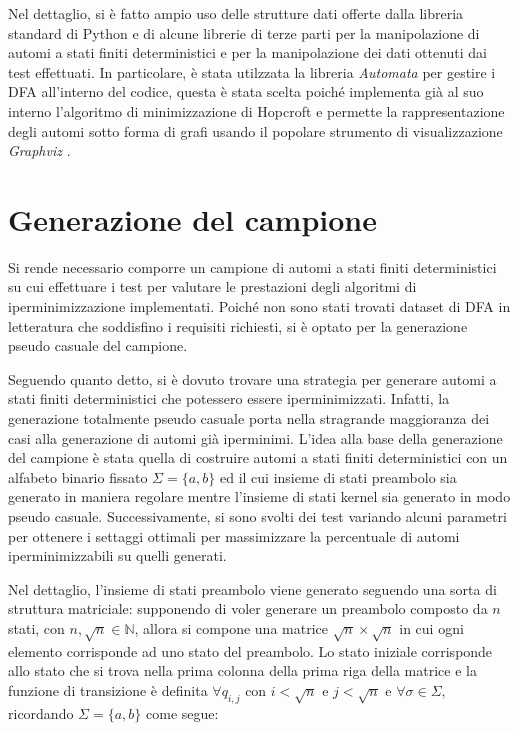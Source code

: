 \documentclass[a4paper,12pt,twoside, openright]{report} %
\begin{document}
Nel dettaglio, si è fatto ampio uso delle strutture dati offerte dalla libreria standard di Python e 
di alcune librerie di terze parti per la manipolazione di automi a stati finiti deterministici e per la 
manipolazione dei dati ottenuti dai test effettuati. In particolare, è stata utilzzata la 
libreria \emph{Automata} \parencite{Automata} per gestire i DFA all'interno del codice, questa
è stata scelta poiché implementa già al suo interno l'algoritmo di minimizzazione di Hopcroft e permette la
rappresentazione degli automi sotto forma di grafi usando il popolare strumento di visualizzazione 
\emph{Graphviz} \parencite{Graphviz}.

\section{Generazione del campione}
\label{sec:sample-generation}

Si rende necessario comporre un campione di automi a stati finiti deterministici su cui effettuare i test
per valutare le prestazioni degli algoritmi di iperminimizzazione implementati. Poiché non sono stati trovati
dataset di DFA in letteratura che soddisfino i requisiti richiesti,
si è optato per la generazione pseudo casuale del campione.

Seguendo quanto detto, si è dovuto trovare una strategia per generare automi a stati finiti deterministici
che potessero essere iperminimizzati. Infatti, la generazione totalmente pseudo casuale porta nella stragrande
maggioranza dei casi alla generazione di automi già iperminimi.
L'idea alla base della generazione del campione è stata quella di costruire automi a stati finiti deterministici
con un alfabeto binario fissato $\Sigma = \{a, b\}$ ed il cui insieme di stati preambolo sia generato in maniera
regolare mentre l'insieme di stati kernel sia generato in modo pseudo casuale. Successivamente, si sono svolti 
dei test variando alcuni parametri per ottenere i settaggi ottimali per massimizzare la percentuale di automi
iperminimizzabili su quelli generati.

Nel dettaglio, l'insieme di stati preambolo viene generato seguendo una sorta di struttura matriciale:
supponendo di voler generare un preambolo composto da $n$ stati, con $n, \sqrt{n} \in \mathbb{N}$, allora si compone una matrice
$\sqrt{n} \times \sqrt{n}$ in cui ogni elemento corrisponde ad uno stato del preambolo. Lo stato iniziale corrisponde
allo stato che si trova nella prima colonna della prima riga della matrice e la funzione di transizione 
è definita $\forall q_{i,j} \text{ con } i < \sqrt{n} \text{ e } j < \sqrt{n}$ e $\forall \sigma \in \Sigma$,
ricordando $\Sigma = \{a, b\}$ come segue:
\end{document}
